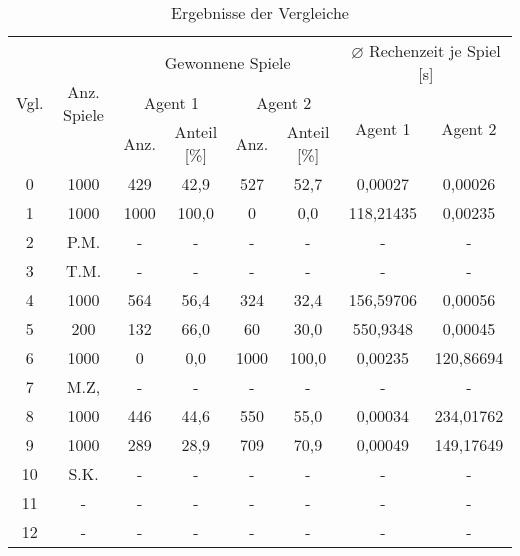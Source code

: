 \begin{table}[ht]
\begin{center}
\begin{tabular}{| c | c | c | c | c | c | c | c |} \hline
\multirow{3}{*}{Vgl.} & \multirow{3}{*}{Anz. Spiele} & \multicolumn{4}{|c|}{Gewonnene Spiele} & \multicolumn{2}{|c|}{$\varnothing$ Rechenzeit je Spiel [s]} \\ \cline{3-8}
                      &                              & \multicolumn{2}{|c|}{Agent 1} & \multicolumn{2}{|c|}{Agent 2} & \multirow{2}{*}{Agent 1} & \multirow{2}{*}{Agent 2} \\ \cline{3-6}
                      &                              & Anz. & Anteil [\%]            & Anz. & Anteil [\%]            &                          &                          \\ \hline
\hline
 0 & 1000 &  429 &  42,9 &  527 &  52,7 &   0,00027 &   0,00026 \\ \hline
 \hline
 1 & 1000 & 1000 & 100,0 &    0 &   0,0   & 118,21435 &   0,00235 \\ \hline
 2 & P.M. & -    & -     & -    & -     & -         & -         \\ \hline
 3 & T.M. & -    & -     & -    & -     & -         & -         \\ \hline
 4 & 1000 &  564 &  56,4 &  324 &  32,4 & 156,59706 &   0,00056 \\ \hline
 5 &  200 &  132 &  66,0 &   60 &  30,0 & 550,9348  &   0,00045 \\ \hline
 \hline
 6 & 1000 &    0 &   0,0 & 1000 & 100,0 &   0,00235 & 120,86694 \\ \hline
 7 & M.Z, & -    & -     & -    & -     & -         & -         \\ \hline
 8 & 1000 &  446 &  44,6 &  550 &  55,0 &   0,00034 & 234,01762 \\ \hline
 9 & 1000 &  289 &  28,9 &  709 &  70,9 &   0,00049 & 149,17649 \\ \hline
10 & S.K. & -    & -     & -    & -     & -         & -         \\ \hline
\hline
11 & -    & -    & -     & -    & -     & -         & -         \\ \hline
12 & -    & -    & -     & -    & -     & -         & -         \\ \hline
\end{tabular}
\end{center}
\caption{Ergebnisse der Vergleiche}
\label{tbl:cmp-results}
\end{table}
\newpage
